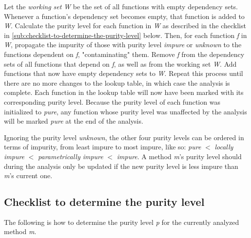 \documentclass[a4paper,12pt]{article}
\begin{document}
Let the \textit{working set} \textit{W} be the set of all functions with empty dependency sets. Whenever a function's dependency set becomes empty, that function is added to \textit{W}. Calculate the purity level for each function in \textit{W} as described in the checklist in \autoref{sub:checklist-to-determine-the-purity-level} below. Then, for each function \textit{f} in \textit{W}, propagate the impurity of those with purity level \textit{impure} or \textit{unknown} to the functions dependent on \textit{f}, "contaminating" them. Remove \textit{f} from the dependency sets of all functions that depend on \textit{f}, as well as from the working set \textit{W}. Add functions that now have empty dependency sets to \textit{W}. Repeat this process until there are no more changes to the lookup table, in which case the analysis is complete. Each function in the lookup table will now have been marked with its corresponding purity level. Because the purity level of each function was initialized to \textit{pure}, any function whose purity level was unaffected by the analysis will be marked \textit{pure} at the end of the analysis.

Ignoring the purity level \textit{unknown}, the other four purity levels can be ordered in terms of impurity, from least impure to most impure, like so: \textit{pure} $<$ \textit{locally impure} $<$ \textit{parametrically impure} $<$ \textit{impure}. A method \textit{m}'s purity level should during the analysis only be updated if the new purity level is less impure than \textit{m}'s current one.

\subsection{Checklist to determine the purity level} \label{sub:checklist-to-determine-the-purity-level}

The following is how to determine the purity level \textit{p} for the currently analyzed method \textit{m}.
\end{document}
